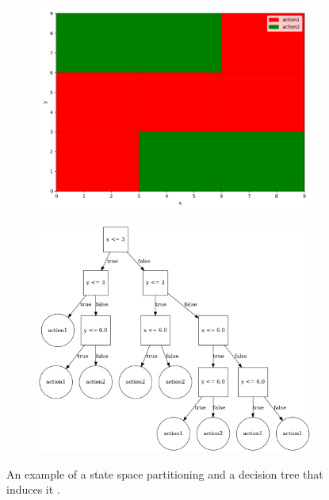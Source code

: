 \documentclass{easychair}
\begin{document}
\begin{figure}[t]
    \begin{subfigure}[b]{.5\textwidth}
        \centering
        \includegraphics[width=\textwidth]{small_example}
        \subcaption{%
        }\label{fig:smallExParts}
    \end{subfigure}
    \begin{subfigure}[b]{.5\textwidth}
        \centering
        \includegraphics[width=\textwidth]{small_example_tree}
        \subcaption{%
        }\label{fig:smallExTree}
    \end{subfigure}%

    \caption{%
        An example of a state space partitioning 
        and a decision tree that induces it .
    }%
    \label{fig:smallEx}
\end{figure}
\end{document}
